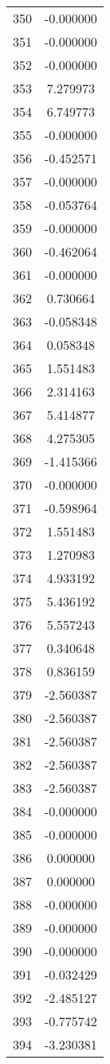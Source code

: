 \documentclass[12pt]{article}
\begin{document}
\begin{longtable}{@{}cc@{}}
350 & -0.000000 \\
351 & -0.000000 \\
352 & -0.000000 \\
353 & 7.279973 \\
354 & 6.749773 \\
355 & -0.000000 \\
356 & -0.452571 \\
357 & -0.000000 \\
358 & -0.053764 \\
359 & -0.000000 \\
360 & -0.462064 \\
361 & -0.000000 \\
362 & 0.730664 \\
363 & -0.058348 \\
364 & 0.058348 \\
365 & 1.551483 \\
366 & 2.314163 \\
367 & 5.414877 \\
368 & 4.275305 \\
369 & -1.415366 \\
370 & -0.000000 \\
371 & -0.598964 \\
372 & 1.551483 \\
373 & 1.270983 \\
374 & 4.933192 \\
375 & 5.436192 \\
376 & 5.557243 \\
377 & 0.340648 \\
378 & 0.836159 \\
379 & -2.560387 \\
380 & -2.560387 \\
381 & -2.560387 \\
382 & -2.560387 \\
383 & -2.560387 \\
384 & -0.000000 \\
385 & -0.000000 \\
386 & 0.000000 \\
387 & 0.000000 \\
388 & -0.000000 \\
389 & -0.000000 \\
390 & -0.000000 \\
391 & -0.032429 \\
392 & -2.485127 \\
393 & -0.775742 \\
394 & -3.230381 \\

\end{longtable}
\end{document}

